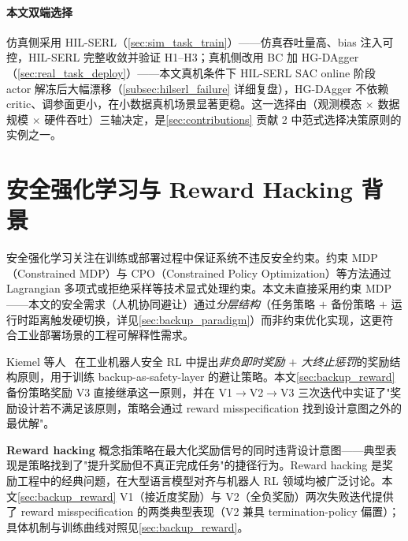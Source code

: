 \paragraph{本文双端选择}仿真侧采用 HIL-SERL（\cref{sec:sim_task_train}）——仿真吞吐量高、bias 注入可控，HIL-SERL 完整收敛并验证 H1–H3；真机侧改用 BC 加 HG-DAgger（\cref{sec:real_task_deploy}）——本文真机条件下 HIL-SERL SAC online 阶段 actor 解冻后大幅漂移（\cref{subsec:hilserl_failure} 详细复盘），HG-DAgger 不依赖 critic、调参面更小，在小数据真机场景显著更稳。这一选择由（观测模态 $\times$ 数据规模 $\times$ 硬件吞吐）三轴决定，是\cref{sec:contributions} 贡献 2 中范式选择决策原则的实例之一。

\section{安全强化学习与 Reward Hacking 背景}\label{sec:safe_rl}

安全强化学习关注在训练或部署过程中保证系统不违反安全约束。约束 MDP（Constrained MDP）与 CPO（Constrained Policy Optimization）等方法通过 Lagrangian 多项式或拒绝采样等技术显式处理约束。本文未直接采用约束 MDP——本文的安全需求（人机协同避让）通过\emph{分层结构}（任务策略 $+$ 备份策略 $+$ 运行时距离触发硬切换，详见\cref{sec:backup_paradigm}）而非约束优化实现，这更符合工业部署场景的工程可解释性需求。

Kiemel 等人~\cite{kiemel2024safe} 在工业机器人安全 RL 中提出\emph{非负即时奖励 $+$ 大终止惩罚}的奖励结构原则，用于训练 backup-as-safety-layer 的避让策略。本文\cref{sec:backup_reward} 备份策略奖励 V3 直接继承这一原则，并在 V1$\to$V2$\to$V3 三次迭代中实证了"奖励设计若不满足该原则，策略会通过 reward misspecification 找到设计意图之外的最优解"。

\textbf{Reward hacking} 概念指策略在最大化奖励信号的同时违背设计意图——典型表现是策略找到了"提升奖励但不真正完成任务"的捷径行为。Reward hacking 是奖励工程中的经典问题，在大型语言模型对齐与机器人 RL 领域均被广泛讨论。本文\cref{sec:backup_reward} V1（接近度奖励）与 V2（全负奖励）两次失败迭代提供了 reward misspecification 的两类典型表现（V2 兼具 termination-policy 偏置）；具体机制与训练曲线对照见\cref{sec:backup_reward}。
